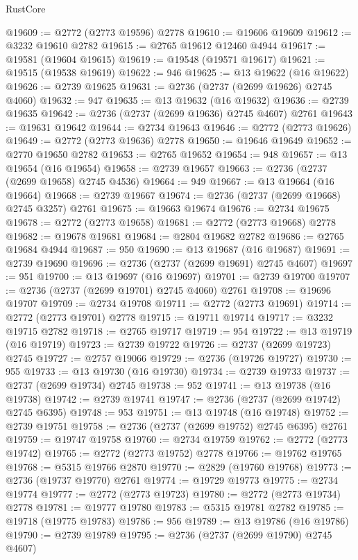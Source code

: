 \begin{lexlean}{RustCore}
\begin{coremodule}
@19609 := @2772 (@2773 @19596) @2778
@19610 := @19606 @19609
@19612 := @3232 @19610 @2782
@19615 := @2765 @19612 @12460 @4944
@19617 := @19581 (@19604 @19615)
@19619 := @19548 (@19571 @19617)
@19621 := @19515 (@19538 @19619)
@19622 := 946
@19625 := @13 @19622 (@16 @19622)
@19626 := @2739 @19625
@19631 := @2736 (@2737 (@2699 @19626) @2745 @4060)
@19632 := 947
@19635 := @13 @19632 (@16 @19632)
@19636 := @2739 @19635
@19642 := @2736 (@2737 (@2699 @19636) @2745 @4607) @2761
@19643 := @19631 @19642
@19644 := @2734 @19643
@19646 := @2772 (@2773 @19626)
@19649 := @2772 (@2773 @19636) @2778
@19650 := @19646 @19649
@19652 := @2770 @19650 @2782
@19653 := @2765 @19652
@19654 := 948
@19657 := @13 @19654 (@16 @19654)
@19658 := @2739 @19657
@19663 := @2736 (@2737 (@2699 @19658) @2745 @4536)
@19664 := 949
@19667 := @13 @19664 (@16 @19664)
@19668 := @2739 @19667
@19674 := @2736 (@2737 (@2699 @19668) @2745 @3257) @2761
@19675 := @19663 @19674
@19676 := @2734 @19675
@19678 := @2772 (@2773 @19658)
@19681 := @2772 (@2773 @19668) @2778
@19682 := @19678 @19681
@19684 := @2804 @19682 @2782
@19686 := @2765 @19684 @4944
@19687 := 950
@19690 := @13 @19687 (@16 @19687)
@19691 := @2739 @19690
@19696 := @2736 (@2737 (@2699 @19691) @2745 @4607)
@19697 := 951
@19700 := @13 @19697 (@16 @19697)
@19701 := @2739 @19700
@19707 := @2736 (@2737 (@2699 @19701) @2745 @4060) @2761
@19708 := @19696 @19707
@19709 := @2734 @19708
@19711 := @2772 (@2773 @19691)
@19714 := @2772 (@2773 @19701) @2778
@19715 := @19711 @19714
@19717 := @3232 @19715 @2782
@19718 := @2765 @19717
@19719 := 954
@19722 := @13 @19719 (@16 @19719)
@19723 := @2739 @19722
@19726 := @2737 (@2699 @19723) @2745
@19727 := @2757 @19066
@19729 := @2736 (@19726 @19727)
@19730 := 955
@19733 := @13 @19730 (@16 @19730)
@19734 := @2739 @19733
@19737 := @2737 (@2699 @19734) @2745
@19738 := 952
@19741 := @13 @19738 (@16 @19738)
@19742 := @2739 @19741
@19747 := @2736 (@2737 (@2699 @19742) @2745 @6395)
@19748 := 953
@19751 := @13 @19748 (@16 @19748)
@19752 := @2739 @19751
@19758 := @2736 (@2737 (@2699 @19752) @2745 @6395) @2761
@19759 := @19747 @19758
@19760 := @2734 @19759
@19762 := @2772 (@2773 @19742)
@19765 := @2772 (@2773 @19752) @2778
@19766 := @19762 @19765
@19768 := @5315 @19766 @2870
@19770 := @2829 (@19760 @19768)
@19773 := @2736 (@19737 @19770) @2761
@19774 := @19729 @19773
@19775 := @2734 @19774
@19777 := @2772 (@2773 @19723)
@19780 := @2772 (@2773 @19734) @2778
@19781 := @19777 @19780
@19783 := @5315 @19781 @2782
@19785 := @19718 (@19775 @19783)
@19786 := 956
@19789 := @13 @19786 (@16 @19786)
@19790 := @2739 @19789
@19795 := @2736 (@2737 (@2699 @19790) @2745 @4607)

\end{coremodule}
\end{lexlean}
